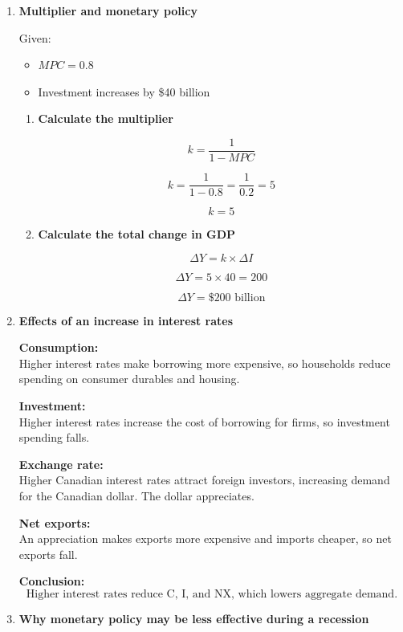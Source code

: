 \documentclass[12pt]{article}
\begin{document}
\begin{enumerate}[label=\textbf{\arabic*.}, start=10]

\item \textbf{Multiplier and monetary policy}

Given:
\begin{itemize}
    \item \(MPC = 0.8\)
    \item Investment increases by \$40 billion
\end{itemize}

\begin{enumerate}
    \item[(a)] \textbf{Calculate the multiplier}

\[
k = \frac{1}{1-MPC}
\]

\[
k = \frac{1}{1-0.8} = \frac{1}{0.2} = 5
\]

\[
\boxed{k = 5}
\]

\item[(b)] \textbf{Calculate the total change in GDP}

\[
\Delta Y = k \times \Delta I
\]

\[
\Delta Y = 5 \times 40 = 200
\]

\[
\boxed{\Delta Y = \$200 \text{ billion}}
\]
\end{enumerate}

\item \textbf{Effects of an increase in interest rates}

\textbf{Consumption:}\\
Higher interest rates make borrowing more expensive, so households reduce spending on consumer durables and housing.

\textbf{Investment:}\\
Higher interest rates increase the cost of borrowing for firms, so investment spending falls.

\textbf{Exchange rate:}\\
Higher Canadian interest rates attract foreign investors, increasing demand for the Canadian dollar. The dollar appreciates.

\textbf{Net exports:}\\
An appreciation makes exports more expensive and imports cheaper, so net exports fall.

\textbf{Conclusion:}
\[
\boxed{\text{Higher interest rates reduce C, I, and NX, which lowers aggregate demand.}}
\]

\item \textbf{Why monetary policy may be less effective during a recession}


\end{enumerate}
\end{document}

